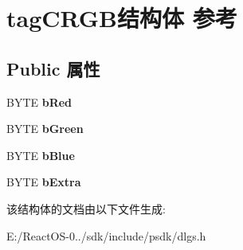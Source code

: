 \hypertarget{structtag_c_r_g_b}{}\section{tag\+C\+R\+G\+B结构体 参考}
\label{structtag_c_r_g_b}
\subsection*{Public 属性}
\begin{DoxyCompactItemize}
\item 
\mbox{\label{structtag_c_r_g_b_aca2ee2ca67aafefef12a36abfbfdba82}} 
B\+Y\+TE {\bfseries b\+Red}
\item 
\mbox{\label{structtag_c_r_g_b_ab9b8fe39a60605cdfa60ca2f01298461}} 
B\+Y\+TE {\bfseries b\+Green}
\item 
\mbox{\label{structtag_c_r_g_b_ae22dca8783868639976ad2b7965fcffe}} 
B\+Y\+TE {\bfseries b\+Blue}
\item 
\mbox{\label{structtag_c_r_g_b_aeb6b303a0f39c2d2a4cc7c3a25805a08}} 
B\+Y\+TE {\bfseries b\+Extra}
\end{DoxyCompactItemize}


该结构体的文档由以下文件生成\+:\begin{DoxyCompactItemize}
\item 
E\+:/\+React\+O\+S-\/0../sdk/include/psdk/dlgs.\+h\end{DoxyCompactItemize}
